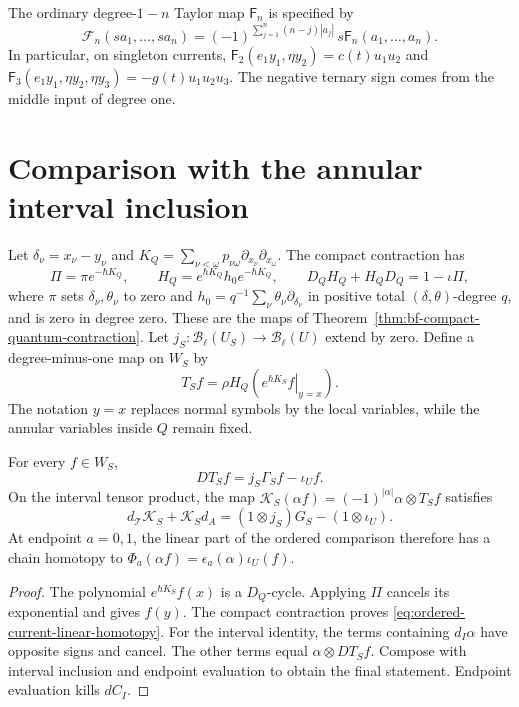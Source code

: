 The ordinary degree-$1-n$ Taylor map $\mathsf F_n$ is specified by
\[
 \mathcal F_n(sa_1,\ldots,sa_n)
 =(-1)^{\sum_{j=1}^n(n-j)|a_j|}\,s\mathsf F_n(a_1,\ldots,a_n).
\]
In particular, on singleton currents,
$\mathsf F_2(e_1y_1,\eta y_2)=c(t)u_1u_2$ and
$\mathsf F_3(e_1y_1,\eta y_2,\eta y_3)=-g(t)u_1u_2u_3$.
The negative ternary sign comes from the middle input of degree one.

\section{Comparison with the annular interval inclusion}

Let $\delta_\nu=x_\nu-y_\nu$ and
$K_Q=\sum_{\nu<\omega}p_{\nu\omega}\partial_{x_\nu}\partial_{x_\omega}$.
The compact contraction has
\[
 \Pi=\pi e^{-\hbar K_Q},\qquad
 H_Q=e^{\hbar K_Q}h_0e^{-\hbar K_Q},\qquad
 D_QH_Q+H_QD_Q=1-\iota\Pi,
\]
where $\pi$ sets $\delta_\nu,\theta_\nu$ to zero and
$h_0=q^{-1}\sum_\nu\theta_\nu\partial_{\delta_\nu}$ in positive
total $(\delta,\theta)$-degree $q$, and is zero in degree zero.
These are the maps of Theorem~\ref{thm:bf-compact-quantum-contraction}.
Let $j_S:\mathcal B_\ell(U_S)\to\mathcal B_\ell(U)$ extend by zero.
Define a degree-minus-one map on $W_S$ by
\[
 T_Sf=\rho H_Q\left(\left.e^{\hbar K_S}f\right|_{y=x}\right).
\]
The notation $y=x$ replaces normal symbols by the local variables,
while the annular variables inside $Q$ remain fixed.

\begin{proposition}
\label{prop:ordered-current-annular-comparison}
For every $f\in W_S$,
\begin{equation}
\label{eq:ordered-current-linear-homotopy}
 D T_Sf=j_S\Gamma_Sf-\iota_U f.
\end{equation}
On the interval tensor product, the map
$\mathcal K_S(\alpha f)=(-1)^{|\alpha|}\alpha\otimes T_Sf$
satisfies
\[
 d_{\mathcal T}\mathcal K_S+\mathcal K_Sd_A
       =(1\otimes j_S)G_S-(1\otimes\iota_U).
\]
At endpoint $a=0,1$, the linear part of the ordered comparison
therefore has a chain homotopy to
$\Phi_a(\alpha f)=\epsilon_a(\alpha)\iota_U(f)$.
\end{proposition}
\begin{proof}
The polynomial $e^{\hbar K_S}f(x)$ is a $D_Q$-cycle.
Applying $\Pi$ cancels its exponential and gives $f(y)$.
The compact contraction proves \eqref{eq:ordered-current-linear-homotopy}.
For the interval identity, the terms containing $d_I\alpha$
have opposite signs and cancel.
The other terms equal $\alpha\otimes DT_Sf$.
Compose with interval inclusion and endpoint evaluation to obtain
the final statement.  Endpoint evaluation kills $dC_I$.
\end{proof}

